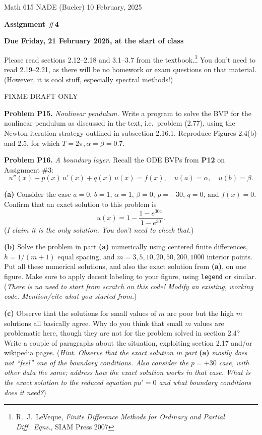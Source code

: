 \documentclass[12pt]{amsart}
\newcommand{\prob}[1]{\bigskip\noindent\textbf{#1}\quad }
\newcommand{\epart}[1]{\medskip\noindent\textbf{(#1)}\quad }
\begin{document}
\scriptsize \noindent Math 615 NADE (Bueler) \hfill 10 February, 2025
\normalsize

\medskip\bigskip

\Large\centerline{\textbf{Assignment \#4}}
\large
\bigskip

\centerline{\textbf{Due Friday, 21 February 2025, at the start of class}}
\bigskip
\normalsize

\thispagestyle{empty}

\bigskip
Please read sections 2.12--2.18 and 3.1--3.7 from the textbook.\footnote{R.~J.~LeVeque, \emph{Finite Difference Methods for Ordinary and Partial Diff.~Eqns.}, SIAM Press 2007}  You don't need to read 2.19--2.21, as there will be no homework or exam questions on that material.  (However, it is cool stuff, especially spectral methods!)

FIXME DRAFT ONLY

\prob{Problem P15.}  \emph{Nonlinear pendulum.}   Write a program to solve the BVP for the nonlinear pendulum as discussed in the text, i.e.~problem (2.77), using the Newton iteration strategy outlined in subsection 2.16.1.  Reproduce Figures 2.4(b) and 2.5, for which $T=2\pi,\alpha=\beta=0.7$.


\prob{Problem P16.}  \emph{A boundary layer.}   Recall the ODE BVPs from \textbf{P12} on Assignment \#3:
\begin{equation*}
u''(x) + p(x)\, u'(x) + q(x)\, u(x) = f(x), \quad u(a) = \alpha, \quad u(b) = \beta.
\end{equation*}

\epart{a}  Consider the case $a=0$, $b=1$, $\alpha=1$, $\beta=0$, $p=-30$, $q=0$, and $f(x)=0$.  Confirm that an exact solution to this problem is
    $$u(x) = 1 - \frac{1 - e^{30x}}{1-e^{30}}.$$
(\emph{I claim it is the only solution.  You don't need to check that.})

\epart{b}  Solve the problem in part \textbf{(a)} numerically using centered finite differences, $h=1/(m+1)$ equal spacing, and $m=3,5,10,20,50,200,1000$ interior points.  Put all these numerical solutions, and also the exact solution from \textbf{(a)}, on one figure.  Make sure to apply decent labeling to your figure, using \texttt{legend} or similar.  (\emph{There is no need to start from scratch on this code!  Modify an existing, working code.  Mention/cite what you started from.})

\epart{c}  Observe that the solutions for small values of $m$ are poor but the high $m$ solutions all basically agree.  Why do you think that small $m$ values are problematic here, though they are not for the problem solved in section 2.4?   Write a couple of paragraphs about the situation, exploiting section 2.17 and/or wikipedia pages. (\emph{Hint.  Observe that the exact solution in part} \textbf{(a)} \emph{mostly does not ``feel'' one of the boundary conditions.  Also consider the $p=+30$ case, with other data the same; address how the exact solution works in that case.  What is the exact solution to the reduced equation $pu'=0$ and what boundary conditions does it need?})
\end{document}
